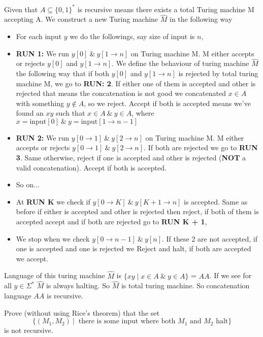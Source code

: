 \documentclass[12pt,a4, onecolumn]{exam}
\begin{document}
\begin{questions}
\begin{solution}
    Given that $A \subseteq \{0,1\}^*$ is recursive means there exists a total Turing machine M accepting A. We construct a new Turing machine $\hat{M}$ in the following way
    \begin{itemize}
        \item For each input $y$ we do the followings, say size of input is $n$,
        \item \textbf{RUN 1:} We run $y[0] \:\&\: y[1 \to n]$ on Turing machine M. M either accepts or rejects $y[0]$ and $y[1 \to n]$. We define the behaviour of turing machine $\hat{M}$ the following way that if both $y[0]$ and $y[1 \to n]$ is rejected by total turing machine M, we go to \textbf{RUN: 2}. If either one of them is accepted and other is rejected that means the concatenation is not good we concatenated $x \in A$ with something $y \notin A$, so we reject. Accept if both is accepted means we've found an $xy$ such that $x \in A \:\&\: y \in A$, where $x=\text{input}[0] \:\&\: y = \text{input}[1 \to n-1]$
        \item \textbf{RUN 2:} We run $y[0 \to 1] \:\&\: y[2 \to n]$ on Turing machine M. M either accepts or rejects $y[0 \to 1] \:\&\: y[2 \to n]$. If both are rejected we go to \textbf{RUN 3}. Same otherwise, reject if one is accepted and other is rejected (\textbf{NOT} a valid concatenation). Accept if both is accepted.
        \item So on...
        \item At \textbf{RUN K} we check if $y[0 \to K] \:\&\: y[K+1 \to n]$ is accepted. Same as before if either is accepted and other is rejected then reject, if both of them is accepted accept and if both are rejected go to \textbf{RUN K + 1},
        \item We stop when we check $y[0 \to n-1] \:\&\: y[n]$. If these 2 are not accepted, if one is accepted and one is rejected we Reject and halt, if both are accepted we accept.
    \end{itemize}

    Language of this turing machine $\hat{M}$ is $\{xy \mid x \in A \:\&\: y \in A\}$ = $AA$. If we see for all $y \in \Sigma^*$ $\hat{M}$ is always halting. So $\hat{M}$ is total turing machine. So concatenation language $AA$ is recursive.
    
    \end{solution}

    \question Prove  (without using Rice's theorem) that the set \[\{ (M_1, M_2)~|~\mbox{ there is some input where both $M_1$  and $M_2 $ halt}\}\]is not recursive.


\end{questions}
\end{document}
